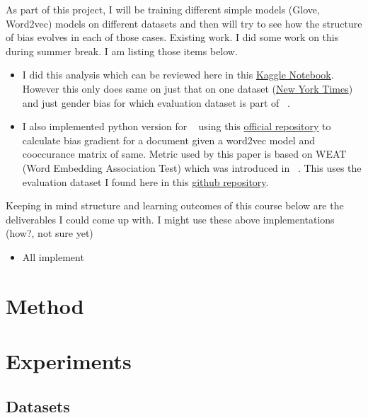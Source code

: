 \documentclass[sigconf,authordraft]{acmart}
\begin{document}
As part of this project, I will be training different simple models (Glove, Word2vec) models on different datasets and then will try to see how the structure of bias evolves in each of those cases. 
Existing work. I did some work on this during summer break. I am listing those items below.
\begin{itemize}
    \item I did this analysis which can be reviewed here in this \href{https://www.kaggle.com/code/alphadraco/nyt-analysis-10-years}{Kaggle Notebook}. However this only does same on just that on one dataset (\href{https://www.kaggle.com/datasets/tumanovalexander/nyt-articles-data}{New York Times}) and just gender bias for which evaluation dataset is part of ~\cite{garg_word_2018}.
    \item I also implemented python version for ~\cite{brunet_understanding_2019} using this \href{https://github.com/mebrunet/understanding-bias}{official repository} to calculate bias gradient for a document given a word2vec model and cooccurance matrix of same. Metric used by this paper is based on WEAT (Word Embedding Association Test) which was introduced in ~\cite{caliskan_semantics_2017}. This uses the evaluation dataset I found here in this \href{https://github.com/chadaeun/weat_replication/tree/master/weat}{github repository}. 
\end{itemize}  

Keeping in mind structure and learning outcomes of this course below are the deliverables I could come up with. I might use these above implementations (how?, not sure yet) 
\begin{itemize}
    \item All implement
\end{itemize}





\section{Method}



\section{Experiments}


\subsection{Datasets}
\end{document}
